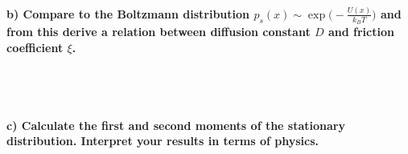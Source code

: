 \paragraph{b) Compare to the Boltzmann distribution 
    $p_s(x)\sim\exp\bigg(-\frac{U(x)}{k_BT}\bigg)$ and from this derive a 
    relation between diffusion constant $D$ and friction coefficient $\xi$.
} \ \\
\\

\paragraph{c) Calculate the first and second moments of the stationary
    distribution. Interpret your results in terms of physics.
} \ \\
\\

